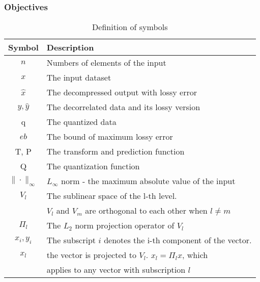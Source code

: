 \subsubsection{Objectives}

\begin{table}[ht]
\vspace{-4mm}
\centering
\footnotesize
\caption{Definition of symbols}
\vspace{-3mm}
\begin{adjustbox}{width=\columnwidth}
\begin{tabular}{|c|l|}
        \hline
        \textbf{Symbol} & \textbf{Description}  \\
        \hline
        $n$             & Numbers of elements of the input \\  \hline
        $x$             & The input dataset \\ \hline
        $\hat{x}$       & The decompressed output with lossy error\\ \hline
        $y,\hat y$      & The decorrelated data and its lossy version \\ \hline
        q & The quantized data \\        \hline        
        $eb$            & The bound of maximum lossy error  \\        \hline
        T, P & The transform and prediction function \\        \hline
        Q & The quantization function \\        \hline
        $\|\cdot\|_\infty$  & $L_\infty$ norm - the maximum absolute value of the input \\        \hline
        $V_l$             & The sublinear space of the l-th level. \\
                          & $V_l$ and $V_m$ are orthogonal to each other when $l \neq m$\\ \hline
       $\Pi_l$             & The $L_2$ norm projection operator of $V_l$\\ \hline
       $x_i, y_i$    & The subscript $i$ denotes the i-th component of the vector. \\ \hline
        $x_l$           & the vector is projected to $V_l$. $x_l = \Pi_l x$, which \\
                        & applies to any vector with subscription $l$\\
        \hline

\end{tabular}
\end{adjustbox}
\label{tb:symbols}
\end{table}



